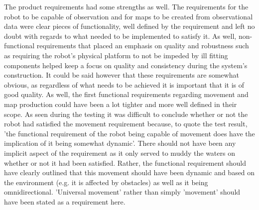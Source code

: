	The product requirements had some strengths as well. The requirements for the robot to be capable of observation and for maps to be created from observational data were clear pieces of functionality, well defined by the requirement and left no doubt with regards to what needed to be implemented to satisfy it. As well, non-functional requirements that placed an emphasis on quality and robustness such as requiring the robot's physical platform to not be impeded by ill fitting components helped keep a focus on quality and consistency during the system's construction. It could be said however that these requirements are somewhat obvious, as regardless of what needs to be achieved it is important that it is of good quality. As well, the first functional requirements regarding movement and map production could have been a lot tighter and more well defined in their scope. As seen during the testing it was difficult to conclude whether or not the robot had satisfied the movement requirement because, to quote the test result, 'the functional requirement of the robot being capable of movement does have the implication of it being somewhat dynamic'. There should not have been any implicit aspect of the requirement as it only served to muddy the waters on whether or not it had been satisfied. Rather, the functional requirement should have clearly outlined that this movement should have been dynamic and based on the environment (e.g. it is affected by obstacles) as well as it being omnidirectional. 'Universal movement' rather than simply 'movement' should have been stated as a requirement here. 
	
